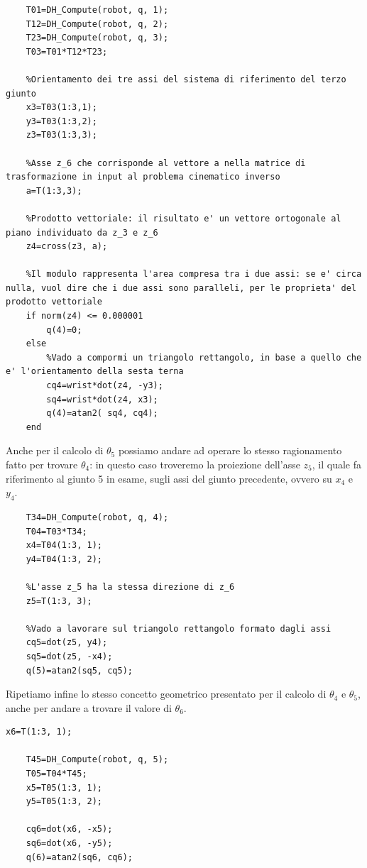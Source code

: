 \begin{lstlisting}[style=Matlab-editor,caption=Calcolo di $\theta_4$,captionpos=b,label={Code:theta4}, basicstyle=\footnotesize\ttfamily,frame=trBL]
	%Vado a calcolare la matrice di trasformazione omogenea del terzo giunto sfruttando le proprieta' delle matrici di trasformazione
	T01=DH_Compute(robot, q, 1);
	T12=DH_Compute(robot, q, 2);
	T23=DH_Compute(robot, q, 3);
	T03=T01*T12*T23;
	
	%Orientamento dei tre assi del sistema di riferimento del terzo giunto
	x3=T03(1:3,1);
	y3=T03(1:3,2);
	z3=T03(1:3,3);

	%Asse z_6 che corrisponde al vettore a nella matrice di trasformazione in input al problema cinematico inverso
	a=T(1:3,3);
	
	%Prodotto vettoriale: il risultato e' un vettore ortogonale al piano individuato da z_3 e z_6
	z4=cross(z3, a);   
	
	%Il modulo rappresenta l'area compresa tra i due assi: se e' circa nulla, vuol dire che i due assi sono paralleli, per le proprieta' del prodotto vettoriale
	if norm(z4) <= 0.000001
		q(4)=0;
	else
		%Vado a compormi un triangolo rettangolo, in base a quello che e' l'orientamento della sesta terna
		cq4=wrist*dot(z4, -y3);
		sq4=wrist*dot(z4, x3);
		q(4)=atan2(	sq4, cq4);
	end
\end{lstlisting}
\newpage
Anche per il calcolo di $\theta_5$ possiamo andare ad operare lo stesso ragionamento fatto per trovare $\theta_4$: in questo caso troveremo la proiezione dell'asse $z_5$, il quale fa riferimento al giunto 5 in esame, sugli assi del giunto precedente, ovvero su  $x_4$ e $y_4$.
\begin{lstlisting}[style=Matlab-editor,caption=Calcolo di $\theta_5$,captionpos=b,label={Code:theta5}, basicstyle=\footnotesize\ttfamily,frame=trBL]
	%Progressiva ricostruzione dell'orientamento e posizione della catena cinematica del manipolatore
	T34=DH_Compute(robot, q, 4);
	T04=T03*T34;
	x4=T04(1:3, 1);
	y4=T04(1:3, 2);
	
	%L'asse z_5 ha la stessa direzione di z_6
	z5=T(1:3, 3); 
	
	%Vado a lavorare sul triangolo rettangolo formato dagli assi	
	cq5=dot(z5, y4);
	sq5=dot(z5, -x4);
	q(5)=atan2(sq5, cq5);
\end{lstlisting}
Ripetiamo infine lo stesso concetto geometrico presentato per il calcolo di $\theta_4$ e $\theta_5$, anche per andare a trovare il valore di $\theta_6$.
\begin{lstlisting}[style=Matlab-editor,caption=Calcolo di $\theta_6$,captionpos=b,label={Code:theta6}, basicstyle=\footnotesize\ttfamily,frame=trBL]
	x6=T(1:3, 1);
	
	T45=DH_Compute(robot, q, 5);
	T05=T04*T45;
	x5=T05(1:3, 1);
	y5=T05(1:3, 2);
	
	cq6=dot(x6, -x5);
	sq6=dot(x6, -y5);
	q(6)=atan2(sq6, cq6);

\end{lstlisting}

